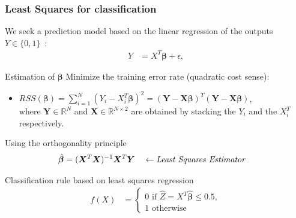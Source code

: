 \documentclass[compress, smaller, serif, 9pt]{beamer}
\begin{document}
\begin{frame}
  \frametitle{Least Squares for classification}
  We seek a prediction model based on the linear regression of the outputs 
  $Y \in \{0,1\}$~:
  \begin{align*}
     Y & = X^T \boldsymbol{\beta} + \epsilon,
  \end{align*}

\begin{block}{Estimation of $\boldsymbol{\beta}$}
Minimize the training error rate (quadratic cost sense):
\begin{itemize}
 \item
 $
 RSS ( \boldsymbol{\beta} )
   = \sum_{i=1}^N (Y_i - X_i^T \boldsymbol{\beta} )^2 =
   (\boldsymbol{Y} - \boldsymbol{X} \boldsymbol{\beta})^T (\boldsymbol{Y} -
   \boldsymbol{X} \boldsymbol{\beta})$,\\
   where
   $\boldsymbol{Y}\in \mathbb{R}^N$ and $\boldsymbol{X}\in \mathbb{R}^{N\times 2}$
   are obtained by stacking the $Y_i$ and the $X_i^T$ respectively.
\end{itemize}

Using the orthogonality principle
\begin{align*}
   \hat{\boldsymbol{\beta}}&=
   (\boldsymbol{X}^T \boldsymbol{X} )^{-1} \boldsymbol{X}^T \boldsymbol{Y}  \quad \leftarrow
   \textrm{\it Least Squares Estimator}
\end{align*}
\end{block}

\begin{block}{Classification rule based on least squares regression}
\vspace{-2mm}
  \begin{align*}
     f(X) &= \begin{cases}
                0 \textrm{ if } \hat{Z}= X^T \hat{\boldsymbol{\beta}} \le 0.5,\\
                1 \textrm{ otherwise}
             \end{cases}
  \end{align*}

\end{block}


\end{frame}
\end{document}
